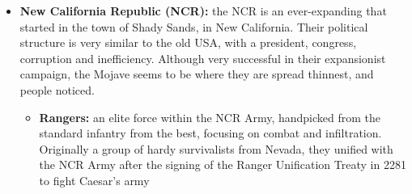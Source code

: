 \documentclass[11pt]{article} %
\begin{document}
\begin{itemize}
\item \textbf{New California Republic (NCR):} the NCR is an ever-expanding that started in the town of Shady Sands, in New California. Their political structure is very similar to the old USA, with a president, congress, corruption and inefficiency. Although very successful in their expansionist campaign, the Mojave seems to be where they are spread thinnest, and people noticed. 
	\begin{itemize}
	\item \textbf{Rangers:} an elite force within the NCR Army, handpicked from the standard infantry from the best, focusing on combat and infiltration. Originally a group of hardy survivalists from Nevada, they unified with the NCR Army after the signing of the Ranger Unification Treaty in 2281 to fight Caesar's army
	\end{itemize}


\end{itemize}
\end{document}
